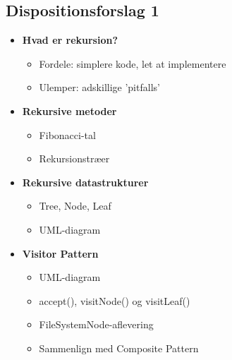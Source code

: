 \subsection{Dispositionsforslag 1}

\begin{itemize}
    \item \textbf{Hvad er rekursion?}
    \begin{itemize}
        \item Fordele: simplere kode, let at implementere
        \item Ulemper: adskillige 'pitfalls'
    \end{itemize}
    
    \item \textbf{Rekursive metoder}
    \begin{itemize}
        \item Fibonacci-tal
        \item Rekursionstræer
    \end{itemize}
    
    \item \textbf{Rekursive datastrukturer}
    \begin{itemize}
        \item Tree, Node, Leaf
        \item UML-diagram
    \end{itemize}
    
    \item \textbf{Visitor Pattern}
    \begin{itemize}
        \item UML-diagram
        \item accept(), visitNode() og visitLeaf()
        \item FileSystemNode-aflevering
        \item Sammenlign med Composite Pattern
    \end{itemize}
    
\end{itemize}
